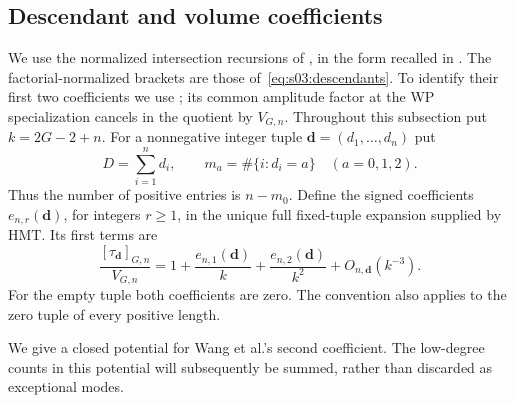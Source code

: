 \documentclass[a4paper,10pt]{article}
\numberwithin{equation}{section}
\theoremstyle{paperplain}
\theoremstyle{paperremark}
\theoremstyle{paperplain}
\begin{document}
\subsection{Descendant and volume coefficients}
\label{subsec:a:01}

We use the normalized intersection recursions of
\cite[Section~2]{MZ15}, in the form recalled in
\cite[Theorem~4.3]{HMT25}. The factorial-normalized brackets are those
of~\eqref{eq:s03:descendants}. To identify their first two coefficients
we use \cite[Lemma~7.2 and Appendix~C.1]{W26}; its common amplitude
factor at the WP specialization cancels in the quotient by $V_{G,n}$.
Throughout this subsection put $k=2G-2+n$. For a nonnegative integer
tuple $\mathbf d=(d_1,\ldots,d_n)$ put
\[
 D=\sum_{i=1}^n d_i,\qquad
 m_a=\#\{i:d_i=a\}\quad(a=0,1,2).
\]
Thus the number of positive entries is $n-m_0$. Define the signed
coefficients $e_{n,r}(\mathbf d)$, for integers $r\geq1$, in the
unique full fixed-tuple expansion supplied by HMT. Its first terms are
\begin{equation}\label{eq:a:profile-definition}
 \frac{[\tau_{\mathbf d}]_{G,n}}{V_{G,n}}
 =1+\frac{e_{n,1}(\mathbf d)}k
     +\frac{e_{n,2}(\mathbf d)}{k^2}+O_{n,\mathbf d}(k^{-3}).
\end{equation}
For the empty tuple both coefficients are zero. The convention also
applies to the zero tuple of every positive length.

We give a closed potential for Wang et al.'s second coefficient.
The low-degree counts in this potential will subsequently be
summed, rather than discarded as exceptional modes.
\end{document}
